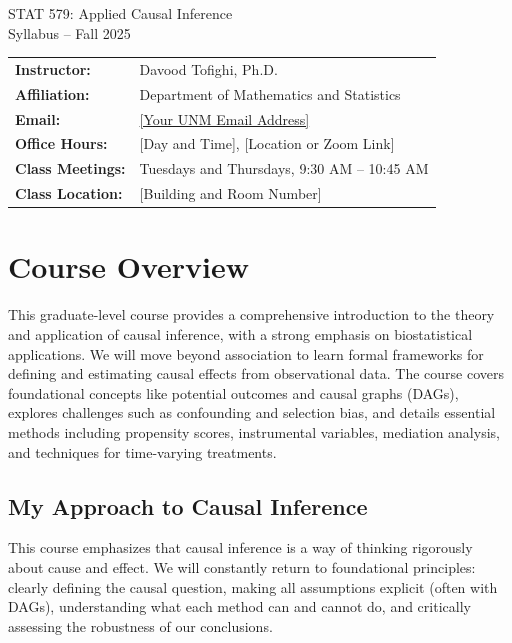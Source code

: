 \documentclass[11pt]{article}
\newcommand{\coursenumber}{STAT 579}
\newcommand{\coursetitle}{Applied Causal Inference}
\newcommand{\semester}{Fall 2025}
\newcommand{\instructor}{Davood Tofighi, Ph.D.}
\newcommand{\email}{[Your UNM Email Address]}
\newcommand{\officehours}{[Day and Time], [Location or Zoom Link]}
\newcommand{\classmeetings}{Tuesdays and Thursdays, 9:30 AM – 10:45 AM}
\newcommand{\location}{[Building and Room Number]}
\begin{document}
\begin{center}
  {\Huge \coursenumber: \coursetitle} \\
  \vspace{4mm}
  {\large Syllabus -- \semester}
\end{center}

\vspace{8mm}

\noindent
\begin{tabularx}{\textwidth}{@{}ll}
  \textbf{Instructor:}     & \instructor \\
  \textbf{Affiliation:}    & Department of Mathematics and Statistics \\
  \textbf{Email:}          & \href{mailto:\email}{\email} \\
  \textbf{Office Hours:}   & \officehours \\
  \textbf{Class Meetings:} & \classmeetings \\
  \textbf{Class Location:} & \location \\
\end{tabularx}

\vspace{6mm}
\section*{Course Overview}
This graduate-level course provides a comprehensive introduction to the theory and application of causal inference, with a strong emphasis on biostatistical applications. We will move beyond association to learn formal frameworks for defining and estimating causal effects from observational data. The course covers foundational concepts like potential outcomes and causal graphs (DAGs), explores challenges such as confounding and selection bias, and details essential methods including propensity scores, instrumental variables, mediation analysis, and techniques for time-varying treatments.

\vspace{6mm}
\subsection*{My Approach to Causal Inference}
This course emphasizes that causal inference is a way of thinking rigorously about cause and effect. We will constantly return to foundational principles: clearly defining the causal question, making all assumptions explicit (often with DAGs), understanding what each method can and cannot do, and critically assessing the robustness of our conclusions.
\end{document}
